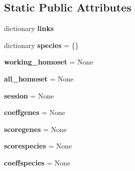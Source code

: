 \subsection*{Static Public Attributes}
\begin{DoxyCompactItemize}
\item 
\mbox{\label{class_py_c_u_b_1_1py_c_u_b_1_1_py_c_u_b_a34f579da0a139dffa0a01c3a90e9ef8d}} 
dictionary {\bfseries links}
\item 
\mbox{\label{class_py_c_u_b_1_1py_c_u_b_1_1_py_c_u_b_a39f174e37479c070657a4e9e710a53ca}} 
dictionary {\bfseries species} = \{\}
\item 
\mbox{\label{class_py_c_u_b_1_1py_c_u_b_1_1_py_c_u_b_ad3b3799416b15243c9027230dcd68482}} 
{\bfseries working\+\_\+homoset} = None
\item 
\mbox{\label{class_py_c_u_b_1_1py_c_u_b_1_1_py_c_u_b_a5e68f8b0897b4e75b69abd6f1ac1beed}} 
{\bfseries all\+\_\+homoset} = None
\item 
\mbox{\label{class_py_c_u_b_1_1py_c_u_b_1_1_py_c_u_b_a24fdc39b781fc1974625810704bd8140}} 
{\bfseries session} = None
\item 
\mbox{\label{class_py_c_u_b_1_1py_c_u_b_1_1_py_c_u_b_abf0e792c29eb4ea90049ca996cad0022}} 
{\bfseries coeffgenes} = None
\item 
\mbox{\label{class_py_c_u_b_1_1py_c_u_b_1_1_py_c_u_b_a70eae30eb6f055c7955969ec573a3f23}} 
{\bfseries scoregenes} = None
\item 
\mbox{\label{class_py_c_u_b_1_1py_c_u_b_1_1_py_c_u_b_acbae28b1a15a26eedfa82aed4c8ae24f}} 
{\bfseries scorespecies} = None
\item 
\mbox{\label{class_py_c_u_b_1_1py_c_u_b_1_1_py_c_u_b_a37440d3a799d825552f477fc4a44c54f}} 
{\bfseries coeffspecies} = None
\end{DoxyCompactItemize}
